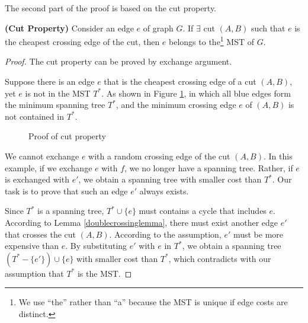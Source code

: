 The second part of the proof is based on the cut property.
\begin{theorem}\label{cutproperty}
\textbf{(Cut Property)}
Consider an edge $e$ of graph $G$. If $\exists$ cut $(A,B)$ such that $e$ is the cheapest crossing edge of the cut, then $e$ belongs to the\footnote{We use ``the'' rather than ``a'' because the MST is unique if edge costs are distinct.} MST of $G$.
\end{theorem}
\begin{proof}
The cut property can be proved by exchange argument.

Suppose there is an edge $e$ that is the cheapest crossing edge of a cut $(A,B)$, yet $e$ is not in the MST $T^*$. As shown in Figure \ref{proofcutproperty}, in which all blue edges form the minimum spanning tree $T^*$, and the minimum crossing edge $e$ of $(A,B)$ is not contained in $T^*$.
\begin{figure}[ht]
\centering
{}
\caption{Proof of cut property}\label{proofcutproperty}
\end{figure}

We cannot exchange $e$ with a random crossing edge of the cut $(A,B)$. In this example, if we exchange $e$ with $f$, we no longer have a spanning tree. Rather, if $e$ is exchanged with $e'$, we obtain a spanning tree with smaller cost than $T^*$. Our task is to prove that such an edge $e'$ always exists. 

Since $T^*$ is a spanning tree, $T^*\cup\{e\}$ must contains a cycle that includes $e$. According to Lemma \ref{doublecrossinglemma}, there must exist another edge $e'$ that crosses the cut $(A,B)$. According to the assumption, $e'$ must be more expensive than $e$. By substituting $e'$ with $e$ in $T^*$, we obtain a spanning tree $(T^*-\{e'\})\cup\{e\}$ with smaller cost than $T^*$, which contradicts with our assumption that $T^*$ is the MST.
\end{proof}

